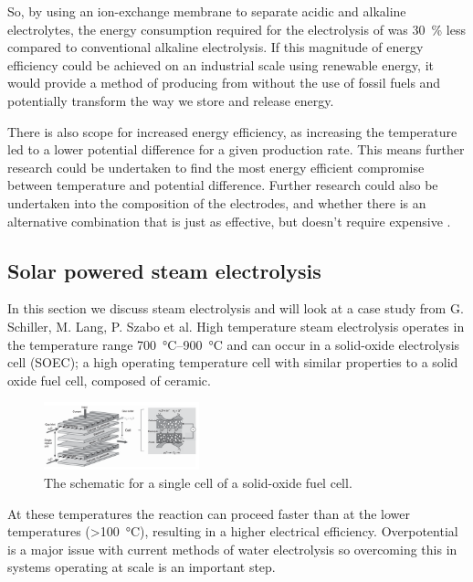 So, by using an ion-exchange membrane to separate acidic and alkaline electrolytes, the energy consumption required for the electrolysis of  was \SI{30}{\percent} less compared to conventional alkaline electrolysis\cite{Lei2019}.
If this magnitude of energy efficiency could be achieved on an industrial scale using renewable energy, it would provide a method of producing  from  without the use of fossil fuels and potentially transform the way we store and release energy.

There is also scope for increased energy efficiency, as increasing the temperature led to a lower potential difference for a given  production rate.
This means further research could be undertaken to find the most energy efficient compromise between temperature and potential difference.
Further research could also be undertaken into the composition of the electrodes, and whether there is an alternative combination that is just as effective, but doesn’t require expensive .

\subsection{Solar powered steam electrolysis}%
\label{sub:solar_powered_steam_electrolysis}
\cite{Schiller2019}

In this section we discuss steam electrolysis and will look at a case study from G. Schiller, M. Lang, P. Szabo et al.\cite{Schiller2019}
High temperature steam electrolysis operates in the temperature range \SIrange{700}{900}{\celsius}\cite{Schiller2019} and can occur in a solid-oxide electrolysis cell (SOEC); a high operating temperature cell with similar properties to a solid oxide fuel cell, composed of ceramic\cite{Laurencin}.
\begin{figure}[H]
	\centering
	\includegraphics[width=0.4\textwidth]{cf89a71a-2c53-11eb-895f-8c8590753a48.png}
	\caption{The schematic for a single cell of a solid-oxide fuel cell.}
	\label{fig:SE_cell}
\end{figure}
At these temperatures the reaction can proceed faster than at the lower temperatures (\SI{>100}{\celsius}), resulting in a higher electrical efficiency\cite{Schiller2019}.
Overpotential is a major issue with current methods of water electrolysis so overcoming this in systems operating at scale is an important step.

